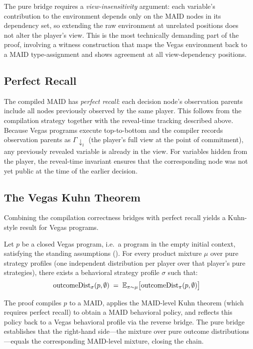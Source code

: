 \documentclass[11pt]{article}
\begin{document}
\noindent
The pure bridge requires a \emph{view-insensitivity} argument: each variable's
contribution to the environment depends only on the MAID nodes in its
dependency set, so extending the raw environment at unrelated positions does
not alter the player's view. This is the most technically demanding part of
the proof, involving a witness construction that maps the Vegas environment
back to a MAID type-assignment and shows agreement at all view-dependency
positions.

\subsection{Perfect Recall}\label{sec:perfect-recall}

The compiled MAID has \emph{perfect recall}: each decision node's observation
parents include all nodes previously observed by the same player. This follows
from the compilation strategy together with the reveal-time tracking described
above. Because Vegas programs execute top-to-bottom and the compiler records
observation parents as $\Gamma\!\!\downarrow_i$ (the player's full view at the
point of commitment), any previously revealed variable is already in the view.
For variables hidden from the player, the reveal-time invariant ensures that
the corresponding node was not yet public at the time of the earlier decision.

\subsection{The Vegas Kuhn Theorem}\label{sec:kuhn}

Combining the compilation correctness bridges with perfect recall yields a
Kuhn-style result for Vegas programs.

\begin{theorem}\label{thm:kuhn}
Let $p$ be a closed Vegas program, i.e.\ a program in the empty initial
context, satisfying the standing assumptions ().
For every product mixture $\mu$ over pure strategy profiles (one independent
distribution per player over that player's pure strategies), there exists a
behavioral strategy profile $\sigma$ such that:
\[
  \mathrm{outcomeDist}_{\sigma}(p, \emptyset) \;=\;
  \mathbb{E}_{\pi \sim \mu}\bigl[\mathrm{outcomeDist}_{\pi}(p, \emptyset)\bigr]
\]
\end{theorem}

\noindent
The proof compiles $p$ to a MAID, applies the MAID-level Kuhn theorem
(which requires perfect recall) to obtain a MAID behavioral policy, and
reflects this policy back to a Vegas behavioral profile via the reverse bridge.
The pure bridge establishes that the right-hand side---the mixture over
pure outcome distributions---equals the corresponding MAID-level mixture,
closing the chain.
\end{document}

